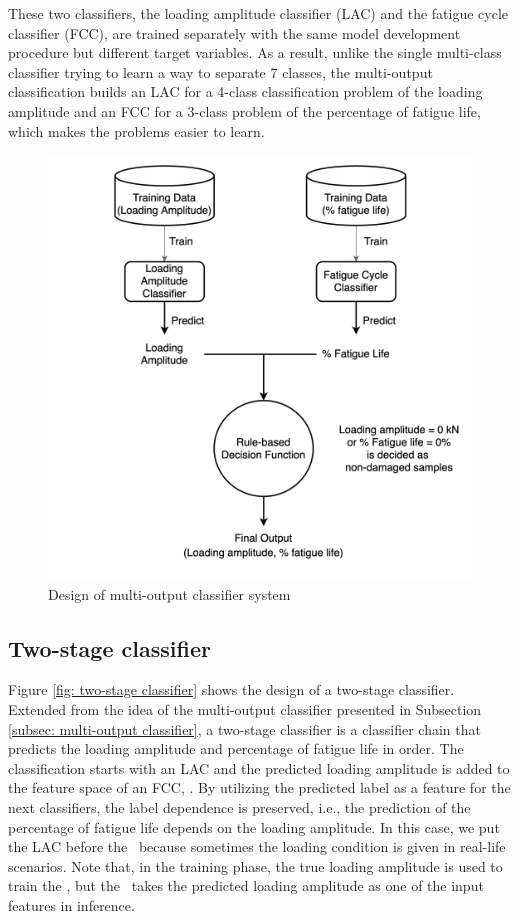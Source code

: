 These two classifiers, the loading amplitude classifier (LAC) and the fatigue cycle classifier (FCC), are trained separately with the same model development procedure but different target variables. As a result, unlike the single multi-class classifier trying to learn a way to separate 7 classes, the multi-output classification builds an LAC for a 4-class classification problem of the loading amplitude and an FCC for a 3-class problem of the percentage of fatigue life, which makes the problems easier to learn.

\begin{figure}[tb]
    \centering
    \includegraphics[width=0.9\linewidth]{fig/multi-ouput_classifier.png}
    \caption{Design of multi-output classifier system}
    \label{fig: multi-output classifier}
\end{figure}

\subsection{Two-stage classifier}
Figure \ref{fig: two-stage classifier} shows the design of a two-stage classifier. Extended from the idea of the multi-output classifier presented in Subsection \ref{subsec: multi-output classifier}, a two-stage classifier is a classifier chain \cite{classifier-chain-READ2007} that predicts the loading amplitude and percentage of fatigue life in order. The classification starts with an LAC and the predicted loading amplitude is added to the feature space of an FCC, \fcctwo. By utilizing the predicted label as a feature for the next classifiers, the label dependence is preserved, i.e., the prediction of the percentage of fatigue life depends on the loading amplitude. In this case, we put the LAC before the \fcctwo \  because sometimes the loading condition is given in real-life scenarios. Note that, in the training phase, the true loading amplitude is used to train the \fcctwo, but the \fcctwo \ takes the predicted loading amplitude as one of the input features in inference.

